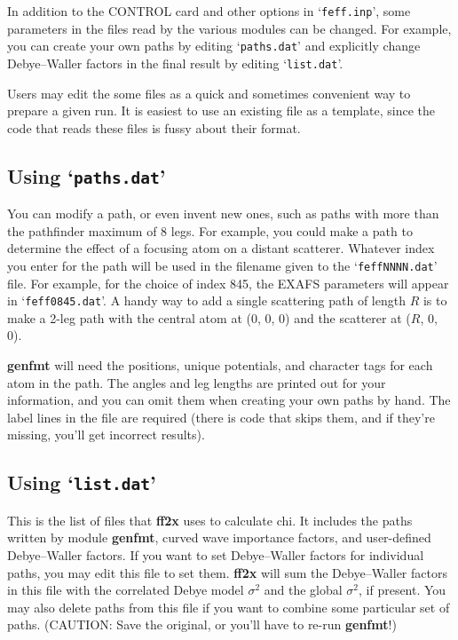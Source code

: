 \documentclass[11pt,oneside]{report} %
\renewcommand{\htmlref}[2]{\hyperlink{#2}{#1}}
\newcommand{\file}[1]{`\texttt{#1}'}
\newcommand{\module}[1]{\textrm{\bf{#1}}}
\renewcommand{\htmlref}[2]{{#1}} %
\begin{document}
\begin{latexonly}
In addition to the \htmlref{CONTROL}{card:con} card and other 
options in \file{feff.inp}, some parameters in the files read 
by the various modules can be changed. For example, you can create 
your own paths by editing \file{paths.dat} and explicitly change 
Debye--Waller factors in the final result by editing \file{list.dat}.

Users may edit the some files as a quick and sometimes convenient way
to prepare a given run. It is easiest to use an existing file as a
template, since the code that reads these files is fussy about their format.



\subsection{Using \file{paths.dat}}
\label{sec:paths.dat}

You can modify a path, or even invent new ones, such as paths
with more than the pathfinder maximum of 8 legs. For example, you
could make a path to determine the effect of a focusing atom on a
distant scatterer. Whatever index you enter for the path will be used
in the filename given to the \file{feffNNNN.dat} file. For example,
for the choice of index 845, the EXAFS parameters will appear in
\file{feff0845.dat}.
A handy way to add a single scattering path of length $R$ is to make a
2-leg path with the central atom at (0, 0, 0) and the scatterer at
($R$, 0, 0).

\module{genfmt} will need the positions, unique potentials, and character tags
for each atom in the path. The angles and leg lengths are printed out
for your information, and you can omit them when creating your own
paths by hand. The label lines in the file are required (there is code
that skips them, and if they're missing, you'll get incorrect results).






\subsection{Using \file{list.dat}}
\label{sec:list.dat}

This is the list of files that \module{ff2x} uses to calculate chi. It
includes the paths written by module \module{genfmt}, curved wave importance
factors, and user-defined Debye--Waller factors. If you want to set
Debye--Waller factors for individual paths, you may edit this file to
set them. \module{ff2x} will sum the Debye--Waller factors in this file with
the correlated Debye model $\sigma^2$ and the global $\sigma^2$, if
present. You may also delete paths from this file if you want to
combine some particular set of paths. (CAUTION: Save the original, or
you'll have to re-run \module{genfmt}!)




\end{latexonly}
\end{document}
